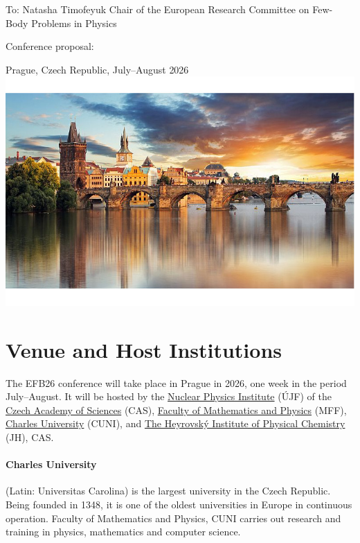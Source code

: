 \documentclass[12pt]{extarticle}
\begin{document}
\color{C0}


\noindent
To: Natasha Timofeyuk \newline
Chair of the European Research Committee \newline
on Few-Body Problems in Physics

\bigskip
\noindent
\doublespacing
  \noindent
  {\Large Conference proposal:}

  \bigskip
\doublespacing
{} \newline
{\Large Prague, Czech Republic, July--August 2026}\\
\includegraphics[width=1.0\textwidth]{Prague_foto_cut}

\onehalfspacing
\section*{Venue and Host Institutions}
\noindent
The EFB26 conference will take place in Prague in 2026, one week in
the period July--August. It will be hosted by the
\href{http://www.ujf.cas.cz/en/}{Nuclear Physics Institute} (ÚJF)
of the
\href{https://www.avcr.cz/en/}{Czech Academy of Sciences} (CAS),
\href{https://www.mff.cuni.cz/en}{Faculty of Mathematics and
  Physics} (MFF), \href{https://cuni.cz/UKEN-1.html}{Charles
  University} (CUNI),
and
\href{https://www.jh-inst.cas.cz/}{The Heyrovský Institute of Physical
  Chemistry} (JH), CAS.

\paragraph{Charles University} (Latin: Universitas Carolina) is the
largest university in the Czech Republic. Being founded in 1348, it is
one of the oldest universities in Europe in continuous operation.
Faculty of Mathematics and Physics, CUNI carries out research and
training in physics, mathematics and computer science.
\end{document}

